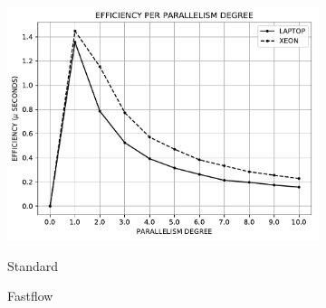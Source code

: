 \begin{figure}
\begin{subfigure}{0.33\textwidth}
{                \includegraphics{imgs/efficiency_standard.pdf}
            }
            \caption{Standard}
            \label{fig:efficiency_standard}
        \end{subfigure}
        \begin{subfigure}{0.33\textwidth}
            \caption{Fastflow}
            \label{fig:efficiency_fastflow}
        \end{subfigure}
        \caption{}
        \label{fig:performances}
    \end{figure}
    \newpage
    \setcounter{page}{2}
